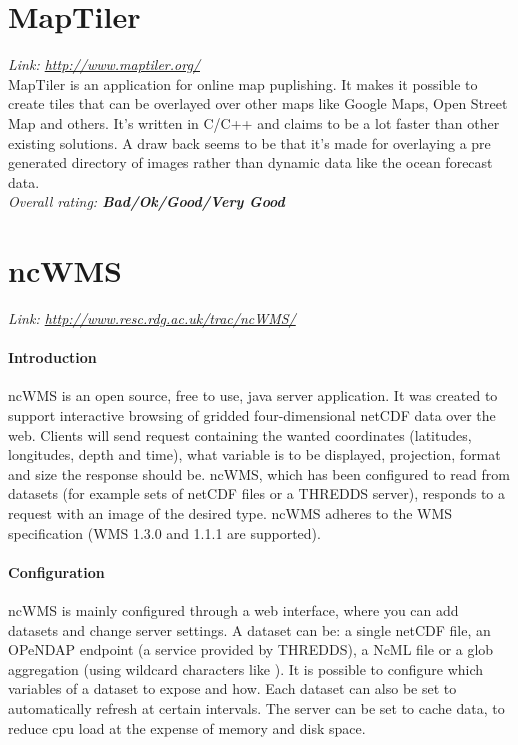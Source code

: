\documentclass[11pt,a4paper,titlepage,oneside]{report}
\begin{document}
  \section{MapTiler}
  \emph{Link: \url{http://www.maptiler.org/}} \\%
    MapTiler is an application for online map puplishing. It makes it possible to create tiles that can be overlayed over other maps like Google Maps, Open Street Map and others. It's written in C/C++ and claims to be a lot faster than other existing solutions. A draw back seems to be that it's made for overlaying a pre generated directory of images rather than dynamic data like the ocean forecast data.
  \\ \emph{Overall rating: \textbf{Bad/Ok/Good/Very Good}}
  
    \section{ncWMS}
  \emph{Link: \url{http://www.resc.rdg.ac.uk/trac/ncWMS/}} \\%
  	\paragraph{Introduction}
    ncWMS is an open source, free to use, java server application. It was created to support interactive browsing of gridded four-dimensional netCDF data over the web. Clients will send request containing the wanted coordinates (latitudes, longitudes, depth and time), what variable is to be displayed, projection, format and size the response should be. ncWMS, which has been configured to read from datasets (for example sets of netCDF files or a THREDDS server), responds to a request with an image of the desired type. ncWMS adheres to the WMS specification (WMS 1.3.0 and 1.1.1 are supported).
    \paragraph{Configuration}
    ncWMS is mainly configured through a web interface, where you can add datasets and change server settings. A dataset can be: a single netCDF file, an OPeNDAP endpoint (a service provided by THREDDS), a NcML file or a glob aggregation (using wildcard characters like ). It is possible to configure which variables of a dataset to expose and how. Each dataset can also be set to automatically refresh at certain intervals. The server can be set to cache data, to reduce cpu load at the expense of memory and disk space.
\end{document}
